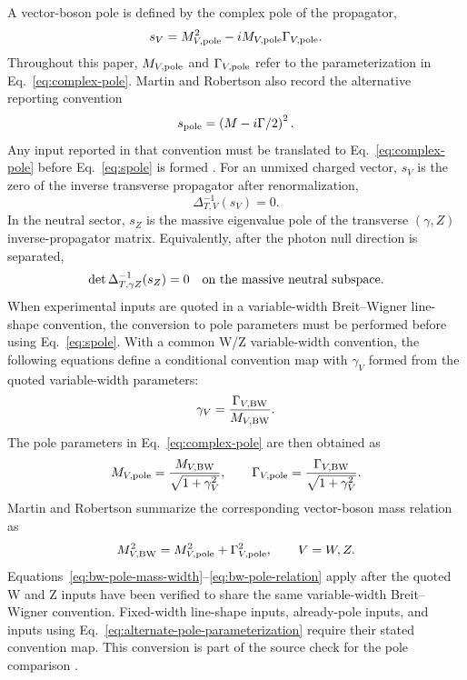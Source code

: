 A vector-boson pole is defined by the complex pole of the propagator,
\begin{equation}
  s_V=M_{V,\rm pole}^2-iM_{V,\rm pole}\Gamma_{V,\rm pole}.
  \label{eq:complex-pole}
\end{equation}
Throughout this paper, \(M_{V,\rm pole}\) and
\(\Gamma_{V,\rm pole}\) refer to the parameterization in
Eq.~\eqref{eq:complex-pole}.  Martin and Robertson also record the
alternative reporting convention
\begin{equation}
  s_{\rm pole}=\left(M-i\Gamma/2\right)^2 .
  \label{eq:alternate-pole-parameterization}
\end{equation}
Any input reported in that convention must be translated to
Eq.~\eqref{eq:complex-pole} before Eq.~\eqref{eq:spole} is formed
\cite{MartinRobertson2025}.
For an unmixed charged vector, \(s_V\) is the zero of the inverse transverse
propagator after renormalization,
\begin{equation}
  \Delta^{-1}_{T,V}(s_V)=0.
  \label{eq:pole-condition}
\end{equation}
In the neutral sector, \(s_Z\) is the massive eigenvalue pole of the transverse
\((\gamma,Z)\) inverse-propagator matrix.  Equivalently, after the photon null
direction is separated,
\begin{equation}
  \det \Delta^{-1}_{T,\gamma Z}(s_Z)=0
  \quad\hbox{on the massive neutral subspace}.
  \label{eq:neutral-pole-condition}
\end{equation}
When experimental inputs are quoted in a variable-width Breit--Wigner
line-shape convention, the conversion to pole parameters must be performed
before using Eq.~\eqref{eq:spole}.  With a common W/Z variable-width
convention, the following equations define a conditional convention map with
\(\gamma_V\) formed from the quoted variable-width parameters:
\begin{equation}
  \gamma_V=\frac{\Gamma_{V,\rm BW}}{M_{V,\rm BW}} .
  \label{eq:bw-width-ratio}
\end{equation}
The pole parameters in Eq.~\eqref{eq:complex-pole} are then obtained as
\begin{equation}
  M_{V,\rm pole}
  =
  \frac{M_{V,\rm BW}}{\sqrt{1+\gamma_V^2}},
  \qquad
  \Gamma_{V,\rm pole}
  =
  \frac{\Gamma_{V,\rm BW}}{\sqrt{1+\gamma_V^2}} .
  \label{eq:bw-pole-mass-width}
\end{equation}
Martin and Robertson summarize the corresponding vector-boson mass relation as
\begin{equation}
  M_{V,\rm BW}^2=M_{V,\rm pole}^2+\Gamma_{V,\rm pole}^2,
  \qquad V=W,Z .
  \label{eq:bw-pole-relation}
\end{equation}
Equations~\eqref{eq:bw-pole-mass-width}--\eqref{eq:bw-pole-relation}
apply after the quoted W and Z inputs have been verified to share the same
variable-width Breit--Wigner convention.  Fixed-width line-shape inputs,
already-pole inputs, and inputs using Eq.~\eqref{eq:alternate-pole-parameterization}
require their stated convention map.  This conversion is part of the source
check for the pole comparison \cite{MartinRobertson2025}.

